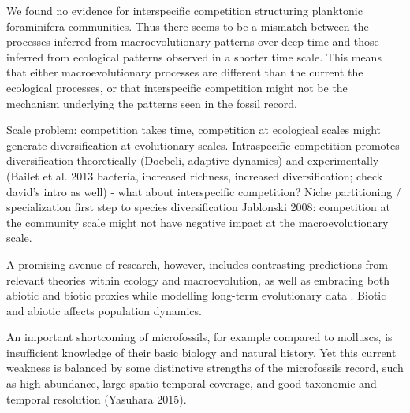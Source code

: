 
We found no evidence for interspecific competition structuring planktonic foraminifera communities. Thus there seems to be a mismatch between the processes inferred from macroevolutionary patterns over deep time and those inferred from ecological patterns observed in a shorter time scale. This means that either macroevolutionary processes are different than the current the ecological processes, or that interspecific competition might not be the mechanism underlying the patterns seen in the fossil record.

Scale problem: competition takes time, competition at ecological scales might generate diversification at evolutionary scales. 
Intraspecific competition promotes diversification theoretically (Doebeli, adaptive dynamics) and experimentally (Bailet et al. 2013 bacteria, increased richness, increased diversification; check david's intro as well) - what about interspecific competition? Niche partitioning / specialization first step to species diversification
Jablonski 2008: competition at the community scale might not have negative impact at the macroevolutionary scale.


A promising avenue of research, however, includes contrasting predictions from relevant theories within ecology and macroevolution, as well as embracing both abiotic and biotic proxies while modelling long-term evolutionary data \citep{voje2015role}. Biotic and abiotic affects population dynamics.

An important shortcoming of microfossils, for example compared to molluscs, is insufficient knowledge of their basic biology and natural history. Yet this current weakness is balanced by some distinctive strengths of the microfossils record, such as high abundance, large spatio-temporal coverage, and good taxonomic and temporal resolution (Yasuhara 2015).

